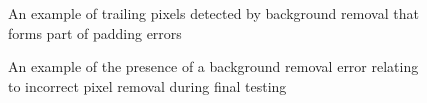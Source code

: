 \begin{figure}[ht]
	\centering
	{%
		\setlength{\fboxsep}{0pt}%
		\setlength{\fboxrule}{0.5pt}%
		}
	\caption{An example of trailing pixels detected by background removal that forms part of padding errors}
	\label{fig:uncertaintyLeft4}
\end{figure}

\begin{figure}[ht]
	\centering
	{%
		\setlength{\fboxsep}{0pt}%
		\setlength{\fboxrule}{0.5pt}%
		}
	\caption{An example of the presence of a background removal error relating to incorrect pixel removal during final testing}
	\label{fig:volunteer7Back}
\end{figure}

